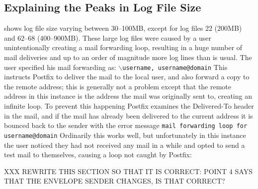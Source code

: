 


\subsection{Explaining the Peaks in Log File Size}

\label{Explaining the peaks in log file size}

 shows log
file size varying between 30--100MB, except for log files 22 (200MB) and
62--68 (400--900MB).  These large log files were caused by a user
unintentionally creating a mail forwarding loop, resulting in a huge number
of mail deliveries and up to an order of magnitude more log lines than is
usual.  The user specified his mail forwarding as: \newline{}
\tab{}\texttt{$\backslash$username, username@domain} \newline{} This
instructs Postfix to deliver the mail to the local user, and also forward a
copy to the remote address; this is generally not a problem except that the
remote address in this instance is the address the mail was originally sent
to, creating an infinite loop.  To prevent this happening Postfix examines
the Delivered-To header in the mail, and if the mail has already been
delivered to the current address it is bounced back to the sender with the
error message \newline{} \tab{} \texttt{mail forwarding loop for
username@domain}\newline{}  Ordinarily this works well, but unfortunately
in this instance the user noticed they had not received any mail in a while
and opted to send a test mail to themselves, causing a loop not caught by
Postfix:

XXX REWRITE THIS SECTION SO THAT IT IS CORRECT\@: POINT 4 SAYS THAT THE
ENVELOPE SENDER CHANGES, IS THAT CORRECT\@?

